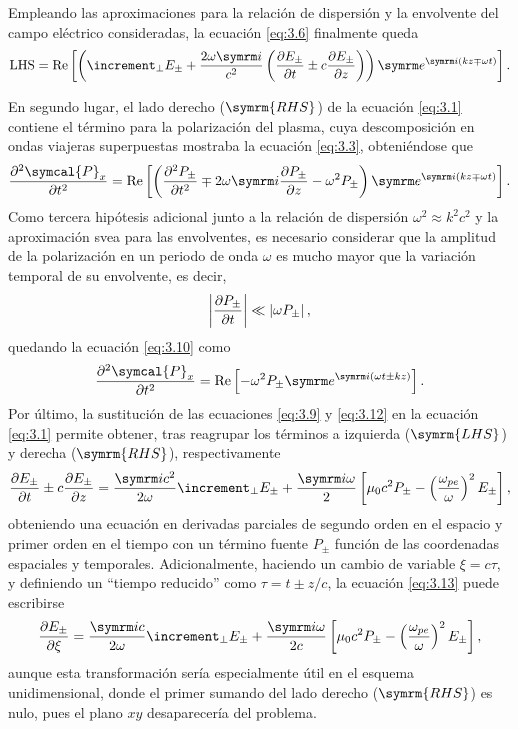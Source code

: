 Empleando las aproximaciones para la relación de dispersión y la envolvente del campo eléctrico consideradas, la ecuación \eqref{eq:3.6} finalmente queda
\begin{equation}\label{eq:3.9}
  \mathrm{LHS} =
  \RE \left[\left(\laplacian_{\perp}E_{\pm } + \frac{2 \omega \iu }{c^{2}} \left(\pdv{E_{\pm }}{t} \pm c \pdv{E_{\pm }}{z}\right)\right)\eu^{\iu (kz \mp \omega t)}\right].
\end{equation}

En segundo lugar, el lado derecho ($\symrm{RHS}$) de la ecuación \eqref{eq:3.1} contiene el término para la polarización del plasma, cuya descomposición en ondas viajeras superpuestas mostraba la ecuación \eqref{eq:3.3}, obteniéndose que
\begin{equation}\label{eq:3.10}
  \pdvN{\symcal{P}_{x}}{t}{2} = 
  \RE \left[\left(\pdvN{P_{\pm }}{t}{2} \mp 2 \omega \iu \pdv{P_{\pm }}{z} - \omega^{2}P_{\pm }\right)\eu^{\iu (kz \mp \omega t)}\right].
\end{equation}
Como tercera hipótesis adicional junto a la relación de dispersión $\omega^{2} \approx k^{2}c^{2}$ y la aproximación \acrshort{svea} para las envolventes, es necesario considerar que la amplitud de la polarización en un periodo de onda $\omega$ es mucho mayor que la variación temporal de su envolvente, es decir,
\begin{equation}\label{eq:3.12}
  \left|\frac{\partial P_{\pm }}{\partial t}\right| \ll \left|\omega P_{\pm }\right|,
\end{equation}
quedando la ecuación \eqref{eq:3.10} como
\begin{equation}\label{eq:3.12}
  \pdvN{\symcal{P}_{x}}{t}{2} = \RE \left[- \omega^{2}P_{\pm }\eu^{\iu (\omega t \pm kz)}\right].
\end{equation}
Por último, la sustitución de las ecuaciones \eqref{eq:3.9} y \eqref{eq:3.12} en la ecuación \eqref{eq:3.1} permite obtener, tras reagrupar los términos a izquierda ($\symrm{LHS}$) y derecha ($\symrm{RHS}$), respectivamente
\begin{equation}\label{eq:3.13}
  \pdv{E_{\pm }}{t} \pm c \pdv{E_{\pm }}{z} = \frac{\iu c^{2}}{2 \omega}\laplacian_{\perp}E_{\pm } + \frac{\iu \omega}{2} \left[\mu_{0}c^{2}P_{\pm } - \left(\frac{\omega_{pe}}{\omega}\right)^{2}E_{\pm }\right],
\end{equation}
obteniendo una ecuación en derivadas parciales de segundo orden en el espacio y primer orden en el tiempo con un término fuente $P_{\pm}$ función de las coordenadas espaciales y temporales. Adicionalmente, haciendo un cambio de variable $\xi = c \tau$, y definiendo un \enquote{tiempo reducido} como $\tau = t \pm z/c$, la ecuación \eqref{eq:3.13} puede escribirse 
\begin{equation}\label{eq:3.13a}
  \pdv{E_{\pm }}{\xi} = \frac{\iu c}{2 \omega}\laplacian_{\perp}E_{\pm } + \frac{\iu \omega}{2c} \left[\mu_{0}c^{2}P_{\pm } - \left(\frac{\omega_{pe}}{\omega}\right)^{2}E_{\pm }\right],
\end{equation}
aunque esta transformación sería especialmente útil en el esquema unidimensional, donde el primer sumando del lado derecho ($\symrm{RHS}$) es nulo, pues el plano $xy$ desaparecería del problema.

